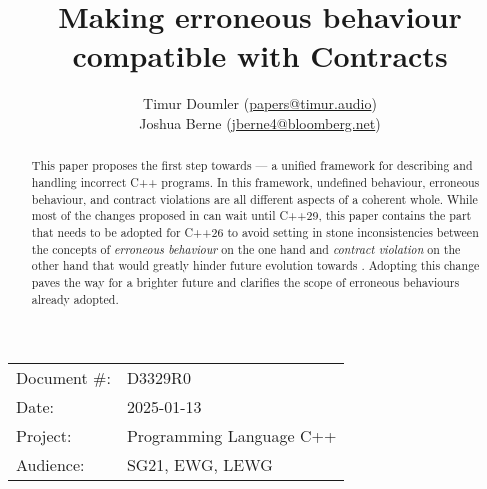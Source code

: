 \title{Making erroneous behaviour compatible with Contracts}
\author{
Timur Doumler \small(\href{mailto:papers@timur.audio}{papers@timur.audio}) \\
Joshua Berne \small(\href{mailto:jberne4@bloomberg.net}{jberne4@bloomberg.net}) \\
}
\date{}
\maketitle

\begin{tabular}{ll}
Document \#: & D3329R0 \\
Date: &2025-01-13 \\
Project: & Programming Language C++ \\
Audience: & SG21, EWG, LEWG
\end{tabular}

\begin{abstract}
This paper proposes the first step towards \cite{P3100R1} --- a unified framework for describing and handling incorrect C++ programs. In this framework, undefined behaviour, erroneous behaviour, and contract violations are all different aspects of a coherent whole. While most of the changes proposed in \cite{P3100R1} can wait until C++29, this paper contains the part that needs to be adopted for C++26 to avoid setting in stone inconsistencies between the concepts of \emph{erroneous behaviour} on the one hand and \emph{contract violation} on the other hand that would greatly hinder future evolution towards \cite{P3100R1}.  Adopting this change paves the way for a brighter future and clarifies the scope of erroneous behaviours already adopted.
\end{abstract}





